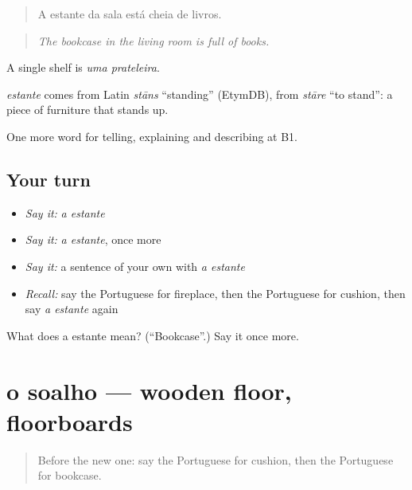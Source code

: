 \begin{quote}
A estante da sala está cheia de livros.
\end{quote}

\begin{quote}
\emph{The bookcase in the living room is full of books.}
\end{quote}

A single shelf is \emph{uma prateleira}.

\begin{cousinweb}
\emph{estante} comes from Latin \emph{stāns} \textquotedblleft{}standing\textquotedblright{} (EtymDB), from \emph{stāre} \textquotedblleft{}to stand\textquotedblright{}: a piece of furniture that stands up.
\end{cousinweb}

\begin{grammarlens}[title={What you've built}]
One more word for telling, explaining and describing at B1.
\end{grammarlens}

\subsection*{Your turn}
\begin{itemize}
\raggedright
  \item \emph{Say it:} \emph{a estante}
  \item \emph{Say it:} \emph{a estante}, once more
  \item \emph{Say it:} a sentence of your own with \emph{a estante}
  \item \emph{Recall:} say the Portuguese for fireplace, then the Portuguese for cushion, then say \emph{a estante} again
\end{itemize}

\begin{tcolorbox}[breakable,colback=teal!4,colframe=teal!35!black,title={Before you move on}]
What does a estante mean? (\textquotedblleft{}Bookcase\textquotedblright{}.) Say it once more.
\end{tcolorbox}
\section[o soalho]{o soalho — wooden floor, floorboards}

\label{lesson:PT-C532-soalho}



\begin{quote}
Before the new one: say the Portuguese for cushion, then the Portuguese for bookcase.
\end{quote}

